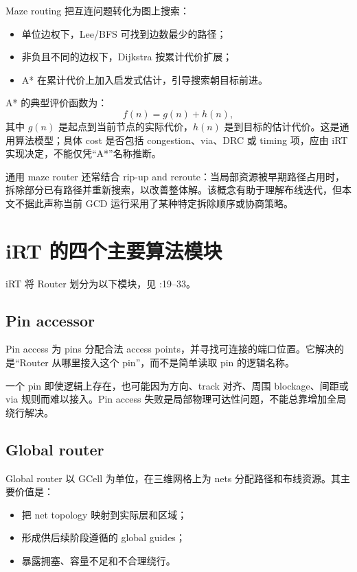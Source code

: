 \documentclass[UTF8,a4paper,11pt,fontset=fandol]{ctexart}
\begin{document}
Maze routing 把互连问题转化为图上搜索：
\begin{itemize}
  \item 单位边权下，Lee/BFS 可找到边数最少的路径；
  \item 非负且不同的边权下，Dijkstra 按累计代价扩展；
  \item A* 在累计代价上加入启发式估计，引导搜索朝目标前进。
\end{itemize}

A* 的典型评价函数为：
\[
  f(n)=g(n)+h(n),
\]
其中 $g(n)$ 是起点到当前节点的实际代价，$h(n)$ 是到目标的估计代价。这是通用算法模型；具体 cost 是否包括 congestion、via、DRC 或 timing 项，应由 iRT 实现决定，不能仅凭“A*”名称推断。

通用 maze router 还常结合 rip-up and reroute：当局部资源被早期路径占用时，拆除部分已有路径并重新搜索，以改善整体解。该概念有助于理解布线迭代，但本文不据此声称当前 GCD 运行采用了某种特定拆除顺序或协商策略。

\section{iRT 的四个主要算法模块}

iRT 将 Router 划分为以下模块，见 :19--33。

\subsection{Pin accessor}

Pin access 为 pins 分配合法 access points，并寻找可连接的端口位置。它解决的是“Router 从哪里接入这个 pin”，而不是简单读取 pin 的逻辑名称。

一个 pin 即使逻辑上存在，也可能因为方向、track 对齐、周围 blockage、间距或 via 规则而难以接入。Pin access 失败是局部物理可达性问题，不能总靠增加全局绕行解决。

\subsection{Global router}

Global router 以 GCell 为单位，在三维网格上为 nets 分配路径和布线资源。其主要价值是：
\begin{itemize}
  \item 把 net topology 映射到实际层和区域；
  \item 形成供后续阶段遵循的 global guides；
  \item 暴露拥塞、容量不足和不合理绕行。
\end{itemize}
\end{document}
